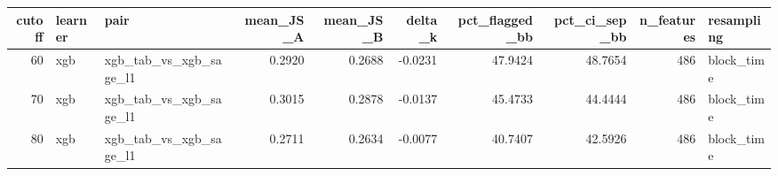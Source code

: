\begin{tabular}{rllrrrrrrl}
\toprule
cutoff & learner & pair & mean\_JS\_A & mean\_JS\_B & delta\_k & pct\_flagged\_bb & pct\_ci\_sep\_bb & n\_features & resampling \\
\midrule
60 & xgb & xgb\_tab\_vs\_xgb\_sage\_l1 & 0.2920 & 0.2688 & -0.0231 & 47.9424 & 48.7654 & 486 & block\_time \\
70 & xgb & xgb\_tab\_vs\_xgb\_sage\_l1 & 0.3015 & 0.2878 & -0.0137 & 45.4733 & 44.4444 & 486 & block\_time \\
80 & xgb & xgb\_tab\_vs\_xgb\_sage\_l1 & 0.2711 & 0.2634 & -0.0077 & 40.7407 & 42.5926 & 486 & block\_time \\
\bottomrule
\end{tabular}

